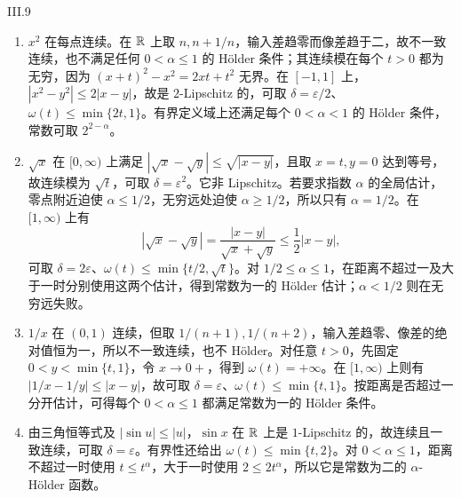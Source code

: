 \begin{solution}{III.9}
\begin{enumerate}
 \item \(x^2\) 在每点连续。在 \(\mathbb{R}\) 上取 \(n,n+1/n\)，输入差趋零而像差趋于二，故不一致连续，也不满足任何 \(0<\alpha\le1\) 的 Hölder 条件；其连续模在每个 \(t>0\) 都为无穷，因为 \((x+t)^2-x^2=2xt+t^2\) 无界。在 \([-1,1]\) 上，\(|x^2-y^2|\le2|x-y|\)，故是 \(2\)-Lipschitz 的，可取 \(\delta=\varepsilon/2\)、\(\omega(t)\le\min\{2t,1\}\)。有界定义域上还满足每个 \(0<\alpha<1\) 的 Hölder 条件，常数可取 \(2^{2-\alpha}\)。
 \item \(\sqrt x\) 在 \([0,\infty)\) 上满足 \(|\sqrt x-\sqrt y|\le\sqrt{|x-y|}\)，且取 \(x=t,y=0\) 达到等号，故连续模为 \(\sqrt t\)，可取 \(\delta=\varepsilon^2\)。它非 Lipschitz。若要求指数 \(\alpha\) 的全局估计，零点附近迫使 \(\alpha\le1/2\)，无穷远处迫使 \(\alpha\ge1/2\)，所以只有 \(\alpha=1/2\)。在 \([1,\infty)\) 上有
 \[
 |\sqrt x-\sqrt y|=\frac{|x-y|}{\sqrt x+\sqrt y}\le\frac12|x-y|,
 \]
 可取 \(\delta=2\varepsilon\)、\(\omega(t)\le\min\{t/2,\sqrt t\}\)。对 \(1/2\le\alpha\le1\)，在距离不超过一及大于一时分别使用这两个估计，得到常数为一的 Hölder 估计；\(\alpha<1/2\) 则在无穷远失败。
 \item \(1/x\) 在 \((0,1)\) 连续，但取 \(1/(n+1),1/(n+2)\)，输入差趋零、像差的绝对值恒为一，所以不一致连续，也不 Hölder。对任意 \(t>0\)，先固定 \(0<y<\min\{t,1\}\)，令 \(x\to0+\)，得到 \(\omega(t)=+\infty\)。在 \([1,\infty)\) 上则有 \(|1/x-1/y|\le|x-y|\)，故可取 \(\delta=\varepsilon\)、\(\omega(t)\le\min\{t,1\}\)。按距离是否超过一分开估计，可得每个 \(0<\alpha\le1\) 都满足常数为一的 Hölder 条件。
 \item 由三角恒等式及 \(|\sin u|\le|u|\)，\(\sin x\) 在 \(\mathbb{R}\) 上是 \(1\)-Lipschitz 的，故连续且一致连续，可取 \(\delta=\varepsilon\)。有界性还给出 \(\omega(t)\le\min\{t,2\}\)。对 \(0<\alpha\le1\)，距离不超过一时使用 \(t\le t^\alpha\)，大于一时使用 \(2\le2t^\alpha\)，所以它是常数为二的 \(\alpha\)-Hölder 函数。
\end{enumerate}
\end{solution}

